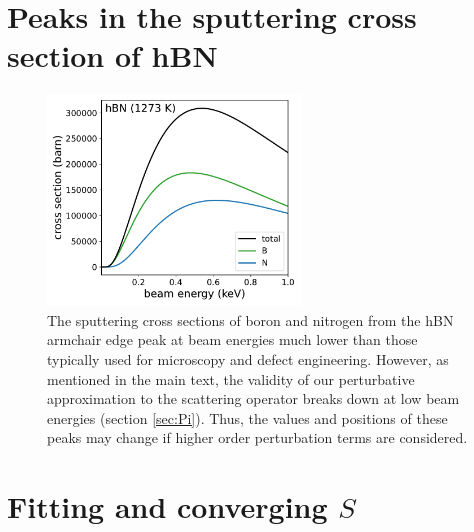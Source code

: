 \documentclass{article}
\begin{document}
\pagebreak
\section{Peaks in the sputtering cross section of hBN}
\label{app:edgePeaks}

\begin{figure}[H]
  \centering
  \includegraphics[width=0.6\textwidth]{figS2.pdf}
  \caption{
    The sputtering cross sections of boron and nitrogen from the hBN armchair
    edge peak at beam energies much lower than those typically used for
    microscopy and defect engineering.
    However, as mentioned in the main text, the validity of our perturbative
    approximation to the scattering operator breaks down at low beam energies
    (section \ref{sec:Pi}).
    Thus, the values and positions of these peaks may change if higher order
    perturbation terms are considered.
  }
  \label{fig:edgePeaks}
\end{figure}

\pagebreak
\section{Fitting and converging $S$}
\label{app:fitting}
\end{document}
